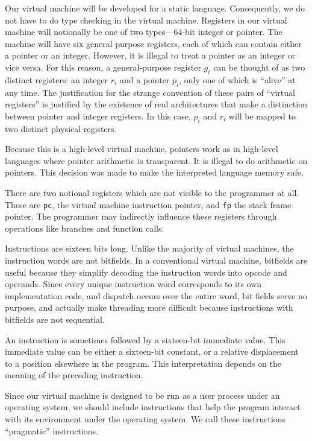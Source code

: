 		Our virtual machine will be developed for a static language. Consequently, we do not have to do type checking in the virtual machine. Registers in our virtual machine will notionally be one of two types---64-bit integer or pointer. The machine will have six general purpose registers, each of which can contain either a pointer or an integer. However, it is illegal to treat a pointer as an integer or vice versa. For this reason, a general-purpose register $g_i$ can be thought of as two distinct registers: an integer $r_i$ and a pointer $p_i$, only one of which is ``alive'' at any time. The justification for the strange convention of these pairs of ``virtual registers'' is justified by the existence of real architectures that make a distinction between pointer and integer registers. In this case, $p_i$ and $r_i$ will be mapped to two distinct physical registers.
		
		Because this is a high-level virtual machine, pointers work as in high-level languages where pointer arithmetic is transparent. It is illegal to do arithmetic on pointers. This decision was made to make the interpreted language memory safe.
		
		There are two notional registers which are not visible to the programmer at all. These are \texttt{pc}, the virtual machine instruction pointer, and \texttt{fp} the stack frame pointer. The programmer may indirectly influence these registers through operations like branches and function calls.
		
		Instructions are sixteen bits long. Unlike the majority of virtual machines, the instruction words are not bitfields. In a conventional virtual machine, bitfields are useful because they simplify decoding the instruction words into opcode and operands. Since every unique instruction word corresponds to its own implementation code, and dispatch occurs over the entire word, bit fields serve no purpose, and actually make  threading more difficult because instructions with bitfields are not sequential.
		
		An instruction is sometimes followed by a sixteen-bit immediate value. This immediate value can be either a sixteen-bit constant, or a relative displacement to a position elsewhere in the program. This interpretation depends on the meaning of the preceding instruction.
		
		Since our virtual machine is designed to be run as a user process under an operating system, we should include instructions that help the program interact with its environment under the operating system. We call these instructions ``pragmatic'' instructions.
		

